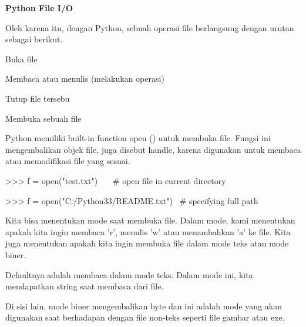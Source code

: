 \begin{center}{\fontsize{24pt}{24pt}\selectfont \textbf{Python File I/O} \\}
\vspace{12pt}

Oleh karena itu, dengan Python, sebuah operasi file berlangsung dengan urutan sebagai berikut. 
\vspace{12pt}

\begin{myEnumerate}
\item Buka file 

\item Membaca atau menulis (melakukan operasi) 

\item Tutup file tersebu\end{myEnumerate}
 
\vspace{12pt}
\vspace{12pt}
\vspace{12pt}
 
Membuka sebuah file 

Python memiliki built-in function open () untuk membuka file. Fungsi ini mengembalikan objek file, juga disebut handle, karena digunakan untuk membaca atau memodifikasi file yang sesuai. 
\vspace{12pt}
 
>>> f = open("test.txt")~~~  $  \#  $ open file in current directory 

>>> f = open("C:/Python33/README.txt")~  $  \#  $ specifying full path 
\vspace{12pt}

Kita bisa menentukan mode saat membuka file. Dalam mode, kami menentukan apakah kita ingin membaca 'r', menulis 'w' atau menambahkan 'a' ke file. Kita juga menentukan apakah kita ingin membuka file dalam mode teks atau mode biner. 
\vspace{12pt}

Defaultnya adalah membaca dalam mode teks. Dalam mode ini, kita mendapatkan string saat membaca dari file. 
\vspace{12pt}

Di sisi lain, mode biner mengembalikan byte dan ini adalah mode yang akan digunakan saat berhadapan dengan file non-teks seperti file gambar atau exe. 
\vspace{12pt}





\end{center}
